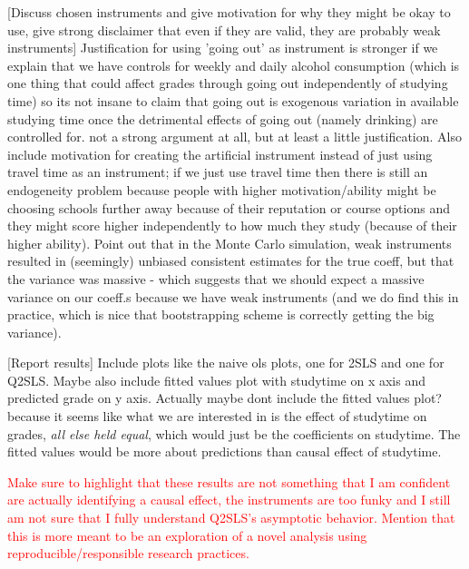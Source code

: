 \documentclass[12pt]{article}
\begin{document}
\textcolor{BrickRed}{[Discuss chosen instruments and give motivation for why they might be okay to use, give strong disclaimer that even if they are valid, they are probably weak instruments]} Justification for using 'going out' as instrument is stronger if we explain that we have controls for weekly and daily alcohol consumption (which is one thing that could affect grades through going out independently of studying time) so its not insane to claim that going out is exogenous variation in available studying time once the detrimental effects of going out (namely drinking) are controlled for. not a strong argument at all, but at least a little justification. Also include motivation for creating the artificial instrument instead of just using travel time as an instrument; if we just use travel time then there is still an endogeneity problem because people with higher motivation/ability might be choosing schools further away because of their reputation or course options and they might score higher independently to how much they study (because of their higher ability). Point out that in the Monte Carlo simulation, weak instruments resulted in (seemingly) unbiased consistent estimates for the true coeff, but that the variance was massive - which suggests that we should expect a massive variance on our coeff.s because we have weak instruments (and we do find this in practice, which is nice that bootstrapping scheme is correctly getting the big variance).

\textcolor{BrickRed}{[Report results]} Include plots like the naive ols plots, one for 2SLS and one for Q2SLS. Maybe also include fitted values plot with studytime on x axis and predicted grade on y axis. Actually maybe dont include the fitted values plot? because it seems like what we are interested in is the effect of studytime on grades, \textit{all else held equal}, which would just be the coefficients on studytime. The fitted values would be more about predictions than causal effect of studytime.

\textcolor{Red}{Make sure to highlight that these results are not something that I am confident are actually identifying a causal effect, the instruments are too funky and I still am not sure that I fully understand Q2SLS's asymptotic behavior. Mention that this is more meant to be an exploration of a novel analysis using reproducible/responsible research practices.}


\newpage
\end{document}
